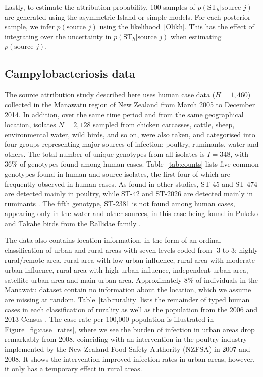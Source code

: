\documentclass[AMA,STIX1COL]{WileyNJD-v2}
\begin{document}
Lastly, to estimate the attribution probability, 100 samples of $p(\text{ST}_h \vert \text{source }j)$ are generated using the asymmetric Island or simple models. For each posterior sample, we infer $p(\text{source }j)$ using the likelihood~\eqref{Olikh}. This has the effect of integrating over the uncertainty in $p(\text{ST}_h \vert \text{source }j)$ when estimating $p(\text{source }j)$.

\subsection{Campylobacteriosis data}

The source attribution study described here uses human case data ($H=1,460$) collected in the Manawatu region of New Zealand from March 2005 to December 2014. In addition, over the same time period and from the same geographical location, isolates $N=2,128$ sampled from chicken carcasses, cattle, sheep, environmental water, wild birds, and so on, were also taken, and categorised into four groups  representing major sources of infection: poultry, ruminants, water and others. The total number of unique genotypes from all isolates is $I=348$, with 36\% of genotypes found among human cases. Table~\ref{tab:counts} lists five common genotypes found in human and source isolates, the first four of which are frequently observed in human cases. As found in other studies, ST-45 and ST-474 are detected mainly in poultry, while ST-42 and ST-2026 are detected mainly in ruminants \cite{Muell, Coll, Cart}. The fifth genotype, ST-2381 is not found among human cases, appearing only in the water and other sources, in this case being found in Pukeko and Takah\={e} birds from the Rallidae family \cite{french2014evolution}.

The data also contains location information, in the form of an ordinal classification of urban and rural areas with seven levels coded from -3 to 3: highly rural/remote area, rural area with low urban influence, rural area with moderate urban influence, rural area with high urban influence, independent urban area, satellite urban area and main urban area. Approximately 8\% of individuals in the Manawatu dataset contain no information about the location, which we assume are missing at random. Table~\ref{tab:rurality} lists the remainder of typed human cases in each classification of rurality as well as the population from the 2006 and 2013 Census \cite{Stat1, Stat2}. The case rate per 100,000 population is illustrated in Figure~\ref{fig:case_rates}, where we see the burden of infection in urban areas drop remarkably from 2008, coinciding with an intervention in the poultry industry implemented by the New Zealand Food Safety Authority (NZFSA) in 2007 and 2008. It shows the intervention improved infection rates in urban areas, however, it only has a temporary effect in rural areas.
\end{document}
